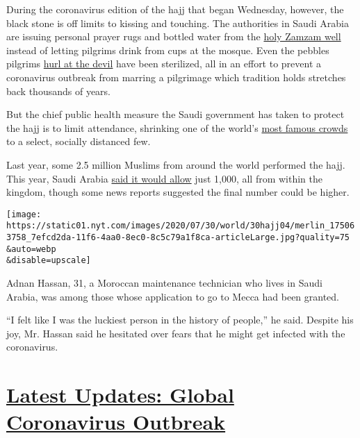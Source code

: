 During the coronavirus edition of the hajj that began Wednesday,
however, the black stone is off limits to kissing and touching. The
authorities in Saudi Arabia are issuing personal prayer rugs and bottled
water from the
\href{https://english.alarabiya.net/en/News/gulf/2018/08/16/Hajj-pilgrims-consume-8-mln-liters-of-Zamzam-water}{holy
Zamzam well} instead of letting pilgrims drink from cups at the mosque.
Even the pebbles pilgrims
\href{https://www.reuters.com/article/us-saudi-haj/muslim-pilgrims-converge-on-jamarat-for-ritual-stoning-of-the-devil-idUSKCN1V109D}{hurl
at the devil} have been sterilized, all in an effort to prevent a
coronavirus outbreak from marring a pilgrimage which tradition holds
stretches back thousands of years.

But the chief public health measure the Saudi government has taken to
protect the hajj is to limit attendance, shrinking one of the world's
\href{https://www.nytimes.com/interactive/2018/08/23/world/middleeast/hajj-attendance-expansion.html?action=click\&module=RelatedLinks\&pgtype=Article}{most
famous crowds} to a select, socially distanced few.

Last year, some 2.5 million Muslims from around the world performed the
hajj. This year, Saudi Arabia
\href{https://www.nytimes.com/2020/06/23/world/middleeast/hajj-pilgrimage-canceled.html}{said
it would allow} just 1,000, all from within the kingdom, though some
news reports suggested the final number could be higher.

\texttt{[image: https://static01.nyt.com/images/2020/07/30/world/30hajj04/merlin\_175063758\_7efcd2da-11f6-4aa0-8ec0-8c5c79a1f8ca-articleLarge.jpg?quality=75\\\&auto=webp\\\&disable=upscale]}

Adnan Hassan, 31, a Moroccan maintenance technician who lives in Saudi
Arabia, was among those whose application to go to Mecca had been
granted.

``I felt like I was the luckiest person in the history of people,'' he
said. Despite his joy, Mr. Hassan said he hesitated over fears that he
might get infected with the coronavirus.

\hypertarget{latest-updates-global-coronavirus-outbreak}{%
\section{\texorpdfstring{\href{https://www.nytimes.com/2020/08/01/world/coronavirus-covid-19.html?action=click\&pgtype=Article\&state=default\&region=MAIN_CONTENT_1\&context=storylines_live_updates}{Latest
Updates: Global Coronavirus
Outbreak}}{Latest Updates: Global Coronavirus Outbreak}}\label{latest-updates-global-coronavirus-outbreak}}

